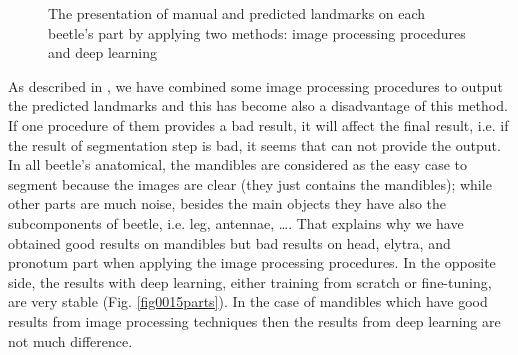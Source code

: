 \documentclass[review]{elsarticle}
\begin{document}
\begin{figure}[htbp]
    \caption{The presentation of manual and predicted landmarks on each beetle's part by applying two methods: image processing procedures and deep learning }
    \label{figmn5parts}
\end{figure}

As described in \cite{le2017maelab}, we have combined some image processing procedures to output the predicted landmarks and this has become also a disadvantage of this method. If one procedure of them provides a bad result, it will affect the final result, i.e. if the result of segmentation step is bad, it seems that can not provide the output. In all beetle's anatomical, the mandibles are considered as the easy case to segment because the images are clear (they just contains the mandibles); while other parts are much noise, besides the main objects they have also the subcomponents of beetle, i.e. leg, antennae, \ldots. That explains why we have obtained good results on mandibles but bad results on head, elytra, and pronotum part when applying the image processing procedures. In the opposite side, the results with deep learning, either training from scratch or fine-tuning, are very stable (Fig. \ref{fig0015parts}). In the case of mandibles which have good results from image processing techniques then the results from deep learning are not much difference.
\end{document}
